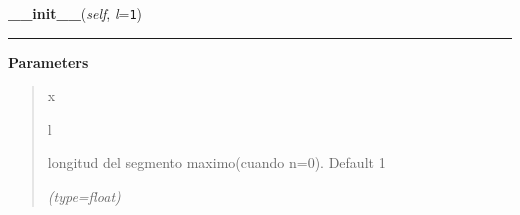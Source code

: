 \hspace{.8\funcindent}\begin{boxedminipage}{\funcwidth}

    \raggedright \textbf{\_\_init\_\_}(\textit{self}, \textit{l}={\tt 1})

    \vspace{-1.5ex}

    \rule{\textwidth}{0.5\fboxrule}
\setlength{\parskip}{2ex}
\setlength{\parskip}{1ex}
      \textbf{Parameters}
      \vspace{-1ex}

      \begin{quote}
        \begin{Ventry}{x}

          \item[l]

          longitud del segmento maximo(cuando n=0). Default 1

            {\it (type=float)}

        \end{Ventry}

      \end{quote}

    \end{boxedminipage}

    \label{FractalZE:koch:Koch:countSegments}

    \vspace{0.5ex}

